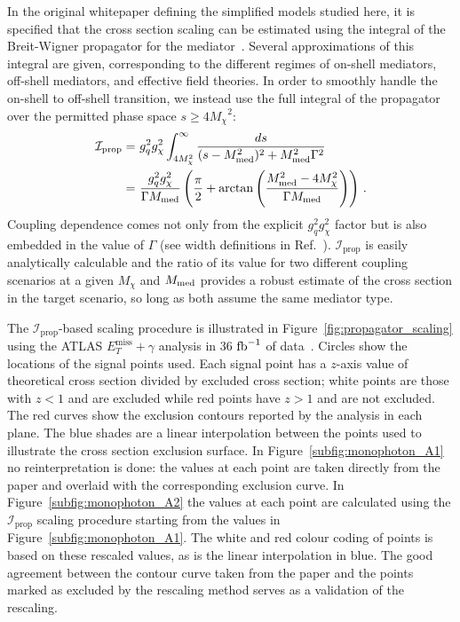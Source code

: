 \documentclass[a4paper, 11pt,notoc]{article}
\newcommand{\MET}{\ensuremath{E_T^\mathrm{miss}}\xspace}
\newcommand{\met}{\MET}
\newcommand{\mDM}{\ensuremath{M_{\chi}}\xspace}
\newcommand{\mMed}{\ensuremath{M_{\rm{med}}}\xspace}
\newcommand{\ifb}{\ensuremath{\rm{fb}^{-1}}\xspace}
\begin{document}
In the original whitepaper defining the simplified models studied here, it is specified that the cross section scaling can be estimated using the integral of the Breit-Wigner propagator for the mediator~\cite{Abercrombie:2015wmb}. Several approximations of this integral are given, corresponding to the different regimes of on-shell mediators, off-shell mediators, and effective field theories. In order to smoothly handle the on-shell to off-shell transition, we instead use the full integral of the propagator over the permitted phase space $s \geq 4 \mDM^2$:
\begin{align}
\mathcal{I}_{\text{prop}} =&\  g_q^2 g_\chi^2 \int_{4\mDM^2}^{\infty} \frac{ds}{(s-\mMed^2)^2+\mMed^2\Gamma^2} \\
=&\  \frac{g_q^2 g_\chi^2}{\Gamma\mMed} \left(\frac{\pi}{2} + \arctan{\left(\frac{\mMed^2 - 4 \mDM^2}{\Gamma\mMed}\right)} \right)\,.
\end{align}
Coupling dependence comes not only from the explicit $g_q^2 g_\chi^2$ factor but is also embedded in the value of $\Gamma$ (see width definitions in Ref.~\cite{Albert:2017onk}).
$\mathcal{I}_{\text{prop}}$ is easily analytically calculable and the ratio of its value for two different coupling scenarios at a given \mDM and \mMed provides a robust estimate of the cross section in the target scenario, so long as both assume the same mediator type.

The $\mathcal{I}_{\text{prop}}$-based scaling procedure is illustrated in Figure~\ref{fig:propagator_scaling} using the ATLAS $\met+\gamma$ analysis in 36 \ifb of data~\cite{monophoton}. Circles show the locations of the signal points used. Each signal point has a $z$-axis value of theoretical cross section divided by excluded cross section; white points are those with $z<1$ and are excluded while red points have $z>1$ and are not excluded. The red curves show the exclusion contours reported by the analysis in each plane. The blue shades are a linear interpolation between the points used to illustrate the cross section exclusion surface. In Figure~\ref{subfig:monophoton_A1} no reinterpretation is done: the values at each point are taken directly from the paper and overlaid with the corresponding exclusion curve. In Figure~\ref{subfig:monophoton_A2} the values at each point are calculated using the $\mathcal{I}_{\text{prop}}$ scaling procedure starting from the values in Figure~\ref{subfig:monophoton_A1}. The white and red colour coding of points is based on these rescaled values, as is the linear interpolation in blue. The good agreement between the contour curve taken from the paper and the points marked as excluded by the rescaling method serves as a validation of the rescaling.
\end{document}
